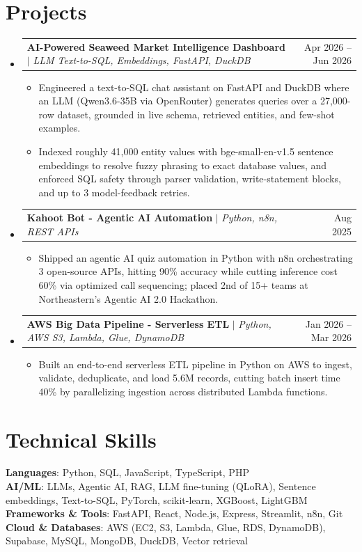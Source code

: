 \documentclass[letterpaper,11pt]{article}
\makeatletter
\newcommand{\resumeItem}[1]{
  \item\small{
    {#1 \vspace{-2pt}}
  }
}
\newcommand{\resumeProjectHeading}[2]{
    \item
    \begin{tabular*}{0.97\textwidth}{l@{\extracolsep{\fill}}r}
      \small#1 & #2 \\
    \end{tabular*}\vspace{-7pt}
}
\newcommand{\resumeSubHeadingListStart}{\begin{itemize}[leftmargin=0.15in, label={}]}
\newcommand{\resumeSubHeadingListEnd}{\end{itemize}}
\newcommand{\resumeItemListStart}{\begin{itemize}}
\newcommand{\resumeItemListEnd}{\end{itemize}\vspace{-5pt}}
\makeatother
\begin{document}
\section{Projects}
    \resumeSubHeadingListStart
      \resumeProjectHeading
          {\textbf{AI-Powered Seaweed Market Intelligence Dashboard} $|$ \emph{LLM Text-to-SQL, Embeddings, FastAPI, DuckDB}}{Apr 2026 -- Jun 2026}
          \resumeItemListStart
            \resumeItem{Engineered a text-to-SQL chat assistant on FastAPI and DuckDB where an LLM (Qwen3.6-35B via OpenRouter) generates queries over a 27,000-row dataset, grounded in live schema, retrieved entities, and few-shot examples.}
            \resumeItem{Indexed roughly 41,000 entity values with bge-small-en-v1.5 sentence embeddings to resolve fuzzy phrasing to exact database values, and enforced SQL safety through parser validation, write-statement blocks, and up to 3 model-feedback retries.}
          \resumeItemListEnd
      \resumeProjectHeading
          {\textbf{Kahoot Bot - Agentic AI Automation} $|$ \emph{Python, n8n, REST APIs}}{Aug 2025}
          \resumeItemListStart
            \resumeItem{Shipped an agentic AI quiz automation in Python with n8n orchestrating 3 open-source APIs, hitting 90\% accuracy while cutting inference cost 60\% via optimized call sequencing; placed 2nd of 15+ teams at Northeastern's Agentic AI 2.0 Hackathon.}
          \resumeItemListEnd
      \resumeProjectHeading
          {\textbf{AWS Big Data Pipeline - Serverless ETL} $|$ \emph{Python, AWS S3, Lambda, Glue, DynamoDB}}{Jan 2026 -- Mar 2026}
          \resumeItemListStart
            \resumeItem{Built an end-to-end serverless ETL pipeline in Python on AWS to ingest, validate, deduplicate, and load 5.6M records, cutting batch insert time 40\% by parallelizing ingestion across distributed Lambda functions.}
          \resumeItemListEnd
    \resumeSubHeadingListEnd

\section{Technical Skills}
 \begin{itemize}[leftmargin=0.15in, label={}]
    \small{\item{
     \textbf{Languages}{: Python, SQL, JavaScript, TypeScript, PHP} \\
     \textbf{AI/ML}{: LLMs, Agentic AI, RAG, LLM fine-tuning (QLoRA), Sentence embeddings, Text-to-SQL, PyTorch, scikit-learn, XGBoost, LightGBM} \\
     \textbf{Frameworks \& Tools}{: FastAPI, React, Node.js, Express, Streamlit, n8n, Git} \\
     \textbf{Cloud \& Databases}{: AWS (EC2, S3, Lambda, Glue, RDS, DynamoDB), Supabase, MySQL, MongoDB, DuckDB, Vector retrieval}
    }}
 \end{itemize}

\end{document}
